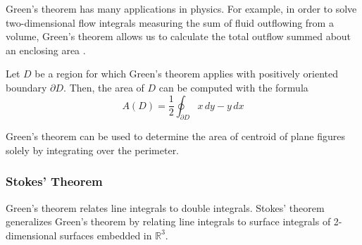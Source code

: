   Green's theorem has many applications in physics. For example, in order to solve two-dimensional flow integrals measuring the sum of fluid outflowing from a volume, Green's theorem allows us to calculate the total outflow summed about an enclosing area . 

  \begin{corollary}
  Let $D$ be a region for which Green's theorem applies with positively oriented boundary $\partial D$. Then, the area of $D$ can be computed with the formula
  \[A(D) = \frac{1}{2} \oint_{\partial D} x \, d y - y \, d x\]
  \end{corollary}

  Green's theorem can be used to determine the area of centroid of plane figures solely by integrating over the perimeter. 

  \subsubsection{Stokes' Theorem}
  Green's theorem relates line integrals to double integrals. Stokes' theorem generalizes Green's theorem by relating line integrals to surface integrals of 2-dimensional surfaces embedded in $\mathbb{R}^3$. 

